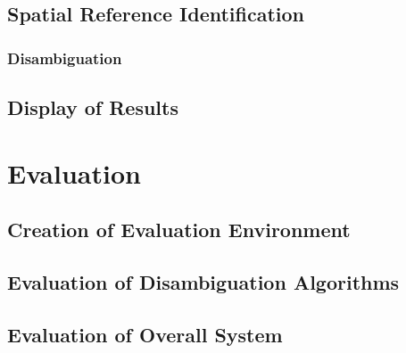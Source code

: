 \documentclass[12pt, a4paper]{report}
\begin{document}


\section{Spatial Reference Identification}


\subsection{Disambiguation}


\section{Display of Results}



\chapter{Evaluation}

\section{Creation of Evaluation Environment}

\section{Evaluation of Disambiguation Algorithms}


\section{Evaluation of Overall System}
\end{document}
